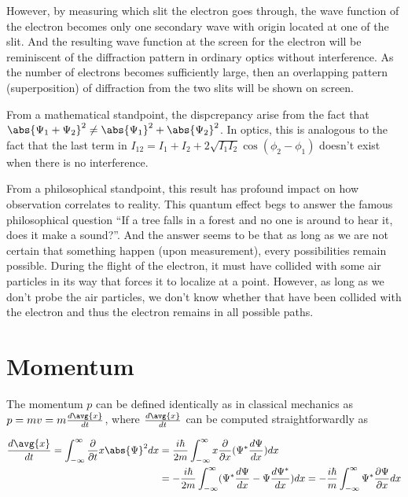 \documentclass[a4paper,12pt]{report}
\begin{document}
However, by measuring which slit the electron goes through, the wave function of the electron becomes only one secondary wave with origin located at one of the slit. And the resulting wave function at the screen for the electron will be reminiscent of the diffraction pattern in ordinary optics without interference. As the number of electrons becomes sufficiently large, then an overlapping pattern (superposition) of diffraction from the two slits will be shown on screen.

From a mathematical standpoint, the dispcrepancy arise from the fact that \(\abs{\Psi_1 + \Psi_2}^2 \neq \abs{\Psi_1}^2 + \abs{\Psi_2}^2\). In optics, this is analogous to the fact that the last term in \(I_{12} = I_1 + I_2 + 2\sqrt{I_1I_2} \cos(\phi_2 - \phi_1)\) doesn't exist when there is no interference. 

From a philosophical standpoint, this result has profound impact on how observation correlates to reality. This quantum effect begs to answer the famous philosophical question ``If a tree falls in a forest and no one is around to hear it, does it make a sound?''. And the answer seems to be that as long as we are not certain that something happen (upon measurement), every possibilities remain possible. During the flight of the electron, it must have collided with some air particles in its way that forces it to localize at a point. However, as long as we don't probe the air particles, we don't know whether that have been collided with the electron and thus the electron remains in all possible paths.

\section{Momentum}
	
The momentum \(p\) can be defined identically as in classical mechanics as \(p=mv=m\frac{d\avg{x}}{dt}\), where \(\frac{d\avg{x}}{dt}\) can be computed straightforwardly as 
	
\begin{equation}
  \begin{aligned}
    \frac{ d\avg{x} }{ dt} = \int_{-\infty}^{\infty} \frac{\partial }{\partial t} x \abs{\Psi }^2 dx &= \frac{i\hbar }{2m} \int_{-\infty}^{\infty} x \frac{\partial }{\partial x} (\Psi ^* \frac{d\Psi}{dx} )dx \\ &= -\frac{i\hbar }{2m} \int_{-\infty}^{\infty} (\Psi ^* \frac{ d\Psi }{ dx} - \Psi \frac{ d\Psi ^*}{ dx} ) dx = -\frac{i\hbar }{m} \int_{-\infty}^{\infty} \Psi ^* \frac{\partial \Psi }{\partial x} dx          
  \end{aligned}
\end{equation}
	
\end{document}
